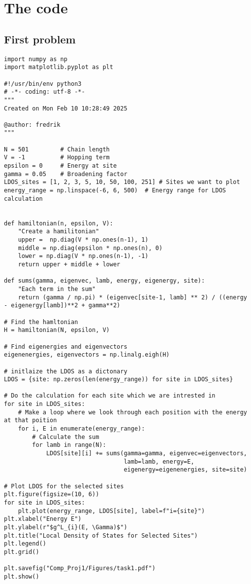 \section{The code}
\subsection{First problem}
\begin{verbatim}
import numpy as np
import matplotlib.pyplot as plt

#!/usr/bin/env python3
# -*- coding: utf-8 -*-
"""
Created on Mon Feb 10 10:28:49 2025

@author: fredrik
"""

N = 501         # Chain length
V = -1          # Hopping term
epsilon = 0     # Energy at site
gamma = 0.05    # Broadening factor
LDOS_sites = [1, 2, 3, 5, 10, 50, 100, 251] # Sites we want to plot
energy_range = np.linspace(-6, 6, 500)  # Energy range for LDOS calculation


def hamiltonian(n, epsilon, V):
    "Create a hamilitonian"
    upper =  np.diag(V * np.ones(n-1), 1)
    middle = np.diag(epsilon * np.ones(n), 0)
    lower = np.diag(V * np.ones(n-1), -1)
    return upper + middle + lower

def sums(gamma, eigenvec, lamb, energy, eigenergy, site):
    "Each term in the sum"
    return (gamma / np.pi) * (eigenvec[site-1, lamb] ** 2) / ((energy - eigenergy[lamb])**2 + gamma**2)
    
# Find the hamltonian
H = hamiltonian(N, epsilon, V)

# Find eigenergies and eigenvectors
eigenenergies, eigenvectors = np.linalg.eigh(H)

# initlaize the LDOS as a dictonary
LDOS = {site: np.zeros(len(energy_range)) for site in LDOS_sites}

# Do the calculation for each site which we are intrested in
for site in LDOS_sites:
    # Make a loop where we look through each position with the energy at that poition 
    for i, E in enumerate(energy_range):
        # Calculate the sum
        for lamb in range(N):
            LDOS[site][i] += sums(gamma=gamma, eigenvec=eigenvectors, 
                                  lamb=lamb, energy=E, 
                                  eigenergy=eigenenergies, site=site)

# Plot LDOS for the selected sites
plt.figure(figsize=(10, 6))
for site in LDOS_sites:
    plt.plot(energy_range, LDOS[site], label=f"i={site}")
plt.xlabel("Energy E")
plt.ylabel(r"$g^L_{i}(E, \Gamma)$")
plt.title("Local Density of States for Selected Sites")
plt.legend()
plt.grid()

plt.savefig("Comp_Proj1/Figures/task1.pdf")
plt.show()
\end{verbatim}


